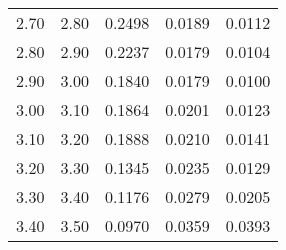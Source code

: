 \begin{tabular}{|c|c||c|c|c|}
   2.70 &    2.80 &  0.2498 &  0.0189 &  0.0112 \\ 
   2.80 &    2.90 &  0.2237 &  0.0179 &  0.0104 \\ 
   2.90 &    3.00 &  0.1840 &  0.0179 &  0.0100 \\ 
   3.00 &    3.10 &  0.1864 &  0.0201 &  0.0123 \\ 
   3.10 &    3.20 &  0.1888 &  0.0210 &  0.0141 \\ 
   3.20 &    3.30 &  0.1345 &  0.0235 &  0.0129 \\ 
   3.30 &    3.40 &  0.1176 &  0.0279 &  0.0205 \\ 
   3.40 &    3.50 &  0.0970 &  0.0359 &  0.0393 \\ 
\hline
\end{tabular}